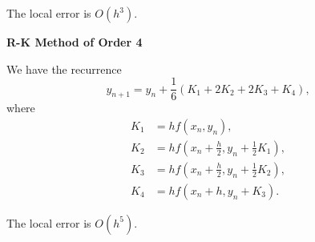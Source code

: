 \documentclass[12pt]{article}
\theoremstyle{definition}
\begin{document}
The local error is $O(h^3).$ 

\textbf{R-K Method of Order 4}

We have the recurrence
\begin{equation*} 
	y_{n + 1} = y_n + \frac{1}{6}(K_1 + 2K_2 + 2K_3 + K_4),
\end{equation*}
where 
\begin{align*} 
	K_1 &= hf(x_n, y_n),\\
	K_2 &= hf\left(x_n + \frac{h}{2}, y_n + \frac{1}{2}K_1\right),\\
	K_3 &= hf\left(x_n + \frac{h}{2}, y_n + \frac{1}{2}K_2\right),\\
	K_4 &= hf(x_n + h, y_n + K_3).
\end{align*}

The local error is $O(h^5).$ 
\end{document}
